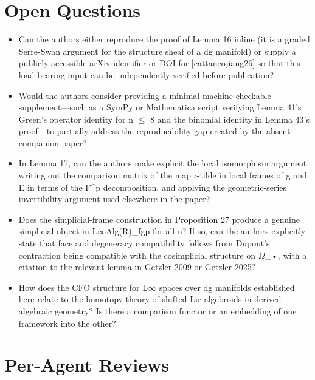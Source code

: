 \documentclass[11pt]{article}
\begin{document}
\section*{Open Questions}
\begin{itemize}[leftmargin=*]
  \item Can the authors either reproduce the proof of Lemma 16 inline (it is a graded Serre-Swan argument for the structure sheaf of a dg manifold) or supply a publicly accessible arXiv identifier or DOI for [cattaneojiang26] so that this load-bearing input can be independently verified before publication?
  \item Would the authors consider providing a minimal machine-checkable supplement---such as a SymPy or Mathematica script verifying Lemma 41's Green's operator identity for n \ensuremath{\le} 8 and the binomial identity in Lemma 43's proof---to partially address the reproducibility gap created by the absent companion paper?
  \item In Lemma 17, can the authors make explicit the local isomorphism argument: writing out the comparison matrix of the map \ensuremath{\iota}-tilde in local frames of g and E in terms of the F\^{}p decomposition, and applying the geometric-series invertibility argument used elsewhere in the paper?
  \item Does the simplicial-frame construction in Proposition 27 produce a genuine simplicial object in L\ensuremath{\infty}Alg(R)\_fgp for all n? If so, can the authors explicitly state that face and degeneracy compatibility follows from Dupont's contraction being compatible with the cosimplicial structure on \ensuremath{\Omega}\_•, with a citation to the relevant lemma in Getzler 2009 or Getzler 2025?
  \item How does the CFO structure for L\ensuremath{\infty} spaces over dg manifolds established here relate to the homotopy theory of shifted Lie algebroids in derived algebraic geometry? Is there a comparison functor or an embedding of one framework into the other?
\end{itemize}

\section*{Per-Agent Reviews}
\end{document}
